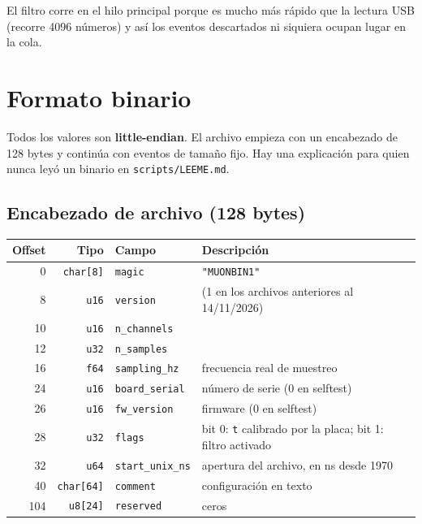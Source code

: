 \documentclass[11pt,a4paper]{article}
\newcommand{\code}[1]{\texttt{#1}}
\begin{document}
El filtro corre en el hilo principal porque es mucho más rápido que la lectura USB
(recorre 4096 números) y así los eventos descartados ni siquiera ocupan lugar en la
cola.

\section{Formato binario}
\label{sec:formato}

Todos los valores son \textbf{little-endian}. El archivo empieza con un encabezado de
128 bytes y continúa con eventos de tamaño fijo. Hay una explicación para quien
nunca leyó un binario en \code{scripts/LEEME.md}.

\subsection{Encabezado de archivo (128 bytes)}

\begin{center}
\small
\begin{tabular}{rrl>{\raggedright\arraybackslash}p{7.4cm}}
\toprule
Offset & Tipo & Campo & Descripción \\
\midrule
0 & \code{char[8]} & \code{magic} & \code{"MUONBIN1"} \\
8 & \code{u16} & \code{version} & 2 (1 en los archivos anteriores al 14/11/2026) \\
10 & \code{u16} & \code{n\_channels} & 4 \\
12 & \code{u32} & \code{n\_samples} & 1024 \\
16 & \code{f64} & \code{sampling\_hz} & frecuencia real de muestreo \\
24 & \code{u16} & \code{board\_serial} & número de serie (0 en selftest) \\
26 & \code{u16} & \code{fw\_version} & firmware (0 en selftest) \\
28 & \code{u32} & \code{flags} & bit 0: \code{t} calibrado por la placa; bit 1: filtro activado \\
32 & \code{u64} & \code{start\_unix\_ns} & apertura del archivo, en ns desde 1970 \\
40 & \code{char[64]} & \code{comment} & configuración en texto \\
104 & \code{u8[24]} & \code{reserved} & ceros \\
\bottomrule
\end{tabular}
\end{center}
\end{document}
